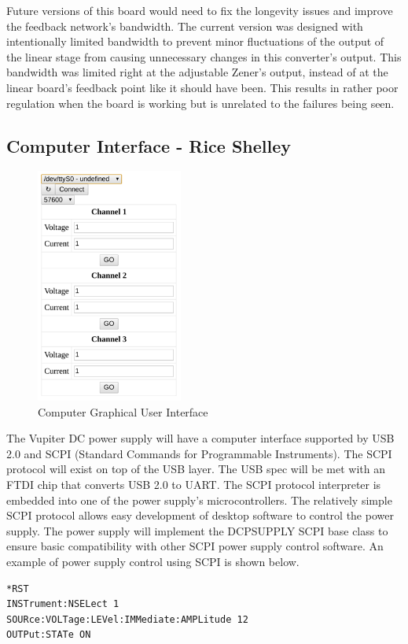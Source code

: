 \documentclass[15pt]{article}
\begin{document}
Future versions of this board would need to fix the longevity issues and improve the feedback network's bandwidth. The current version was designed with intentionally limited bandwidth to prevent minor fluctuations of the output of the linear stage from causing unnecessary changes in this converter's output. This bandwidth was limited right at the adjustable Zener's output, instead of at the linear board's feedback point like it should have been. This results in rather poor regulation when the board is working but is unrelated to the failures being seen.

\subsection{Computer Interface - Rice Shelley}
\begin{figure}
    \begin{center}
      \includegraphics[width=0.43\textwidth]{computersoft.png}
    \end{center}
    \caption{Computer Graphical User Interface}
    \label{fig:computersoft}
  \end{figure}
The Vupiter DC power supply will have a computer interface supported by USB 2.0 and SCPI (Standard Commands for Programmable Instruments). The SCPI protocol will exist on top of the USB layer. The USB spec will be met with an FTDI chip that converts USB 2.0 to UART. The SCPI protocol interpreter is embedded into one of the power supply’s microcontrollers. The relatively simple SCPI protocol allows easy development of desktop software to control the power supply. The power supply will implement the DCPSUPPLY SCPI \cite{10}  base class to ensure basic compatibility with other SCPI power supply control software. An example of power supply control using SCPI is shown below. \\
\begin{verbatim}
*RST
INSTrument:NSELect 1
SOURce:VOLTage:LEVel:IMMediate:AMPLitude 12
OUTPut:STATe ON
\end{verbatim}
\end{document}
